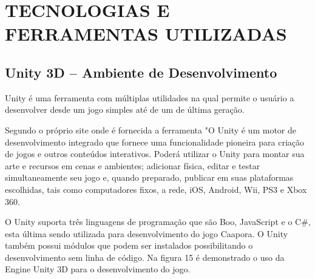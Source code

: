\chapter{TECNOLOGIAS E FERRAMENTAS UTILIZADAS}
\label{cap:TECNOLOGIAS-E-FERRAMENTAS-UTILIZADAS}


\section{Unity 3D – Ambiente de Desenvolvimento}
\label{sec:Unity-3D---Ambiente-de-Desenvolvimento}

Unity é uma ferramenta com múltiplas utilidades na qual permite o usuário a desenvolver desde um jogo simples até de um de última geração.

Segundo o próprio site onde é fornecida a ferramenta "O Unity é um motor de desenvolvimento integrado que fornece uma funcionalidade pioneira para criação de jogos e outros conteúdos interativos. Poderá utilizar o Unity para montar sua arte e recursos em cenas e ambientes; adicionar física, editar e testar simultaneamente seu jogo e, quando preparado, publicar em suas plataformas escolhidas, tais como computadores fixos, a rede, iOS, Android, Wii, PS3 e Xbox 360. 

O Unity suporta três linguagens de programação que são Boo, JavaScript e o C\#, esta última sendo utilizada para desenvolvimento do jogo Caapora. O Unity também possui módulos que podem ser instalados possibilitando o desenvolvimento sem linha de código. \cite{unt}
Na figura 15 é demonstrado o uso da Engine Unity 3D para o desenvolvimento do jogo. 



	\begin{figure}[h!]
		\centering
	\end{figure}
	
